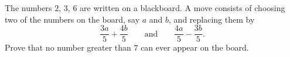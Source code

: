 The numbers $2$, $3$, $6$ are written on a blackboard. A move consists of choosing two of the numbers on the board, say $a$ and $b$, and replacing them by
\[
\dfrac{3a}{5}+\dfrac{4b}{5}\qquad\text{and}\qquad\dfrac{4a}{5}-\dfrac{3b}{5}.
\]
Prove that no number greater than $7$ can ever appear on the board.
